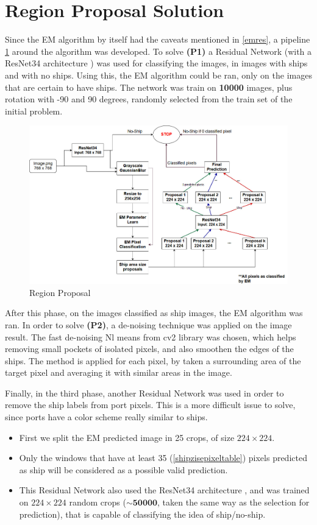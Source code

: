 \section{Region Proposal Solution}
\label{regPropSol}
Since the EM algorithm by itself had the caveats mentioned in \ref{emres}, a pipeline \ref{arch1} around the algorithm was developed.
To solve \textbf{(P1)} a Residual Network (with a ResNet34 architecture \cite{ResNetPaper}) was used for classifying the images, in images with ships and with no ships. Using this, the EM algorithm could be ran, only on the images that are certain to have ships. The network was train on \textbf{10000} images, plus rotation with -90 and 90 degrees, randomly selected from the train set of the initial problem.

\begin{figure}[h]
	\centering
	\includegraphics[angle=90,height=0.8\textheight]{Pictures/010Architecture1.jpg}
	\caption{Region Proposal}
	\label{arch1}
\end{figure}

After this phase, on the images classified as ship images, the EM algorithm was ran. In order to solve \textbf{(P2)}, a de-noising technique was applied on the image result. The fast de-noising Nl means from cv2 library was chosen, which helps removing small pockets of isolated pixels, and also smoothen the edges of the ships. The method is applied for each pixel, by taken a surrounding area of the target pixel and averaging it with similar areas in the image.

Finally, in the third phase, another Residual Network was used in order to remove the ship labels from port pixels. This is a more difficult issue to solve, since ports have a color scheme really similar to ships.
\begin{itemize}
	\item First we split the EM predicted image in 25 crops, of size $224 \times 224$.
	\item Only the windows that have at least 35 (\ref{shipzisepixeltable}) pixels predicted as ship will be considered as a possible valid prediction.
	\item This Residual Network also used the ResNet34 architecture \cite{ResNetPaper}, and was trained on $224\times224$ random crops ($\sim \mathbf{50000}$, taken the same way as the selection for prediction), that is capable of classifying the idea of ship/no-ship.
\end{itemize}

